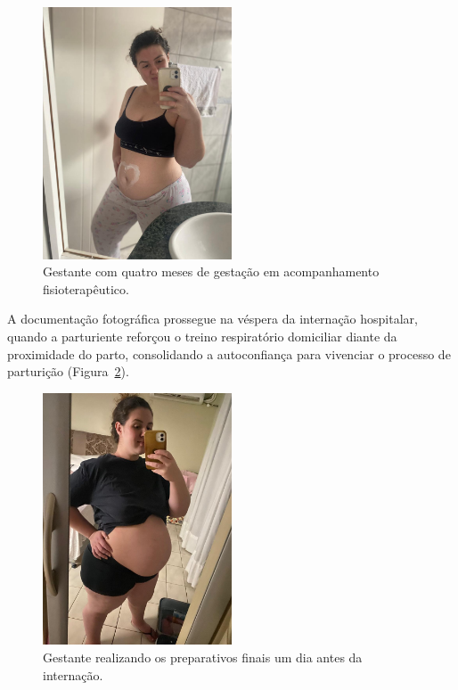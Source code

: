 \documentclass[openright]{tex/estilos/normas-utf-tex}
\begin{document}
\begin{figure}[H]
    \centering
    \includegraphics[width=0.5\textwidth]{assets/imagens/IMG_0753.JPG}
    \caption{Gestante com quatro meses de gestação em acompanhamento fisioterapêutico.}
    \label{fig:gestante-quatro-meses}
\end{figure}

A documentação fotográfica prossegue na véspera da internação hospitalar, quando a parturiente reforçou o treino respiratório domiciliar diante da proximidade do parto, consolidando a autoconfiança para vivenciar o processo de parturição (Figura~\ref{fig:um-dia-antes-internar}).

\begin{figure}[H]
    \centering
    \includegraphics[width=0.5\textwidth]{assets/imagens/IMG_0754.JPG}
    \caption{Gestante realizando os preparativos finais um dia antes da internação.}
    \label{fig:um-dia-antes-internar}
\end{figure}
\end{document}
